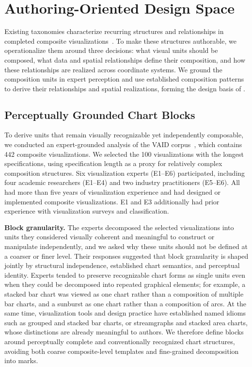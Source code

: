 \section{Authoring-Oriented Design Space}
\label{sec:design-space}

Existing taxonomies characterize recurring structures and relationships in
completed composite visualizations~\cite{javed2012exploring,Composite,vaid}.
To make these structures authorable, we operationalize them around three
decisions: what visual units should be composed, what data and spatial
relationships define their composition, and how these relationships are
realized across coordinate systems. We ground the composition units in expert
perception and use established composition patterns to derive their
relationships and spatial realizations, forming the design basis of {\system}.


\subsection{Perceptually Grounded Chart Blocks}

To derive units that remain visually recognizable yet independently
composable, we conducted an expert-grounded analysis of the VAID
corpus~\cite{vaid}, which contains 442 composite visualizations. We selected
the 100 visualizations with the longest specifications, using specification
length as a proxy for relatively complex composition structures. Six
visualization experts (E1--E6) participated, including four academic
researchers (E1--E4) and two industry practitioners (E5--E6). All had more
than five years of visualization experience and had designed or implemented
composite visualizations. E1 and E3 additionally had prior experience with
visualization surveys and classification.

\textbf{Block granularity.}
The experts decomposed the selected visualizations into units they considered
visually coherent and meaningful to construct or manipulate independently, and
we asked why these units should not be defined at a coarser or finer level.
Their responses suggested that block granularity is shaped jointly by
structural independence, established chart semantics, and perceptual identity.
Experts tended to preserve recognizable chart forms as single units even when
they could be decomposed into repeated graphical elements; for example, a
stacked bar chart was viewed as one chart rather than a composition of multiple
bar charts, and a sunburst as one chart rather than a composition of arcs.
At the same time, visualization tools and design practice have established
named idioms such as grouped and stacked bar charts, or streamgraphs and
stacked area charts, whose distinctions are already meaningful to authors.
We therefore define blocks around perceptually complete and conventionally
recognized chart structures, avoiding both coarse composite-level templates
and fine-grained decomposition into marks.




